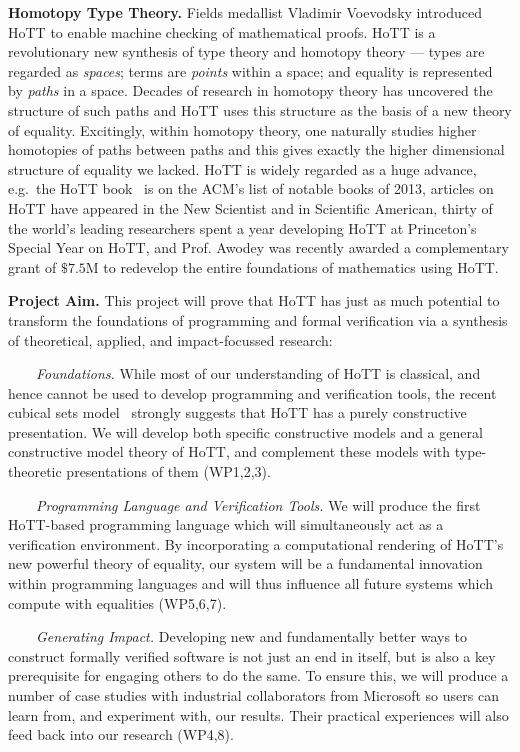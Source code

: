 \documentclass[a4paper,11pt]{article}
\newcommand{\eg}{{e.g.}\ }
\begin{document}
{\bf Homotopy Type Theory.} Fields medallist Vladimir Voevodsky
introduced HoTT to enable machine checking of mathematical proofs.
HoTT is a revolutionary new synthesis of type theory and homotopy
theory --- types are regarded as \emph{spaces}; terms are
\emph{points} within a space; and equality is represented by
\emph{paths} in a space. Decades of research in homotopy theory has
uncovered the structure of such paths and HoTT uses this structure as
the basis of a new theory of equality. Excitingly, within homotopy
theory, one naturally studies higher homotopies of paths between paths
and this gives exactly the higher dimensional structure of equality we
lacked.  HoTT is widely regarded as a huge advance, \eg the HoTT
book~\cite{hott-book} is on the ACM's list of notable books of 2013,
articles on HoTT have appeared in the New Scientist and in Scientific
American, thirty of the world's leading researchers spent a year
developing HoTT at Princeton's Special Year on HoTT, and Prof. Awodey
was recently awarded a complementary grant of $\$ 7.5$M to redevelop
the entire foundations of mathematics using HoTT.


{\bf Project Aim.} This project will prove that HoTT has just as much
potential to transform the foundations of programming and formal
verification via a synthesis of theoretical, applied, and
impact-focussed research:


$\;\;\; \;\;\;$ {\em Foundations.} 
While most of our understanding of HoTT is classical, and hence
cannot be used to develop programming and verification
tools, the recent cubical sets model~\cite{BezemM:cubsmt,nominal} 
strongly suggests that HoTT has a purely constructive
presentation. We will develop both specific constructive models and a
general constructive model theory of HoTT, and complement these models
with type-theoretic presentations of them (WP1,2,3).

$\;\;\;\;\;\;$ {\em Programming Language and Verification Tools.}  We
will produce the first HoTT-based programming language which will
simultaneously act as a verification environment. By incorporating a
computational rendering of HoTT's new powerful theory of equality, our system will
be a fundamental innovation within programming languages and will thus
influence all future systems which compute with equalities (WP5,6,7).

  $\;\;\;\;\;\;$ {\em Generating Impact.} Developing new and
  fundamentally better ways to construct formally verified software is
  not just an end in itself, but is also a key prerequisite 
  for engaging others to do the same.  To ensure this, we will produce
  a number of case studies with industrial collaborators from
  Microsoft so users can learn from, and experiment with, our
  results. Their practical experiences will also feed back into our
  research (WP4,8).
\end{document}
